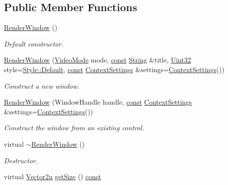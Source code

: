 \subsection*{Public Member Functions}
\begin{DoxyCompactItemize}
\item 
\hyperlink{classsf_1_1_render_window_a839bbf336bdcafb084dafc3076fc9021}{Render\-Window} ()
\begin{DoxyCompactList}\small\item\em Default constructor. \end{DoxyCompactList}\item 
\hyperlink{classsf_1_1_render_window_aebef983e01f677bf5a66cefc4d547647}{Render\-Window} (\hyperlink{classsf_1_1_video_mode}{Video\-Mode} mode, \hyperlink{term__entry_8h_a57bd63ce7f9a353488880e3de6692d5a}{const} \hyperlink{classsf_1_1_string}{String} \&title, \hyperlink{namespacesf_aa746fb1ddef4410bddf198ebb27e727c}{Uint32} style=\hyperlink{group__window_gga363853f6419f9ca64dcd85eae2e5caa9aaf73ca9c9fa787f9da9c1d7527d42734}{Style\-::\-Default}, \hyperlink{term__entry_8h_a57bd63ce7f9a353488880e3de6692d5a}{const} \hyperlink{structsf_1_1_context_settings}{Context\-Settings} \&settings=\hyperlink{structsf_1_1_context_settings}{Context\-Settings}())
\begin{DoxyCompactList}\small\item\em Construct a new window. \end{DoxyCompactList}\item 
\hyperlink{classsf_1_1_render_window_a25c0af7d515e710b6eebc9c6be952aa5}{Render\-Window} (Window\-Handle handle, \hyperlink{term__entry_8h_a57bd63ce7f9a353488880e3de6692d5a}{const} \hyperlink{structsf_1_1_context_settings}{Context\-Settings} \&settings=\hyperlink{structsf_1_1_context_settings}{Context\-Settings}())
\begin{DoxyCompactList}\small\item\em Construct the window from an existing control. \end{DoxyCompactList}\item 
virtual \hyperlink{classsf_1_1_render_window_a3407e36bfc1752d723140438a825365c}{$\sim$\-Render\-Window} ()
\begin{DoxyCompactList}\small\item\em Destructor. \end{DoxyCompactList}\item 
virtual \hyperlink{namespacesf_a41039649eb65ea7646e2b97cfe124b4f}{Vector2u} \hyperlink{classsf_1_1_render_window_a2c7ff414be32621a453745cf2a0f8a3e}{get\-Size} () \hyperlink{term__entry_8h_a57bd63ce7f9a353488880e3de6692d5a}{const} 

\end{DoxyCompactItemize}

